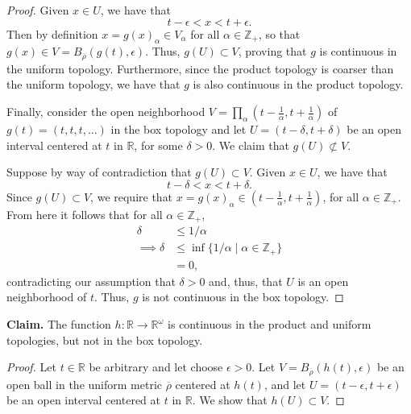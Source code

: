 \documentclass[a4paper,10pt]{article}
\newcommand{\ZZ}{\mathbb{Z}}
\newcommand{\RR}{\mathbb{R}}
\begin{document}
\begin{solution}
\begin{proof}
        Given $x \in U$, we have that
        \begin{equation*}
            t - \epsilon < x < t + \epsilon.
        \end{equation*}
        Then by definition $x = g(x)_\alpha \in V_\alpha$ for all $\alpha \in \ZZ_+$, so that $g(x) \in V = B_{\overline{\rho}}(g(t), \epsilon)$.
        Thus, $g(U) \subset V$, proving that $g$ is continuous in the uniform topology.
        Furthermore, since the product topology is coarser than the uniform topology, we have that $g$ is also continuous in the product topology.

        Finally, consider the open neighborhood $V = \prod_\alpha (t - \tfrac{1}{\alpha}, t + \tfrac{1}{\alpha})$ of $g(t) = (t, t, t, \ldots)$ in the box topology and let $U = (t - \delta, t + \delta)$ be an open interval centered at $t$ in $\RR$, for some $\delta > 0$.
        We claim that $g(U) \not\subset V$.

        Suppose by way of contradiction that $g(U) \subset V$.
        Given $x \in U$, we have that
        \begin{equation*}
            t - \delta < x < t + \delta.
        \end{equation*}
        Since $g(U) \subset V$, we require that $x = g(x)_\alpha \in (t - \tfrac{1}{\alpha}, t + \tfrac{1}{\alpha})$, for all $\alpha \in \ZZ_+$.
        From here it follows that for all $\alpha \in \ZZ_+$,
        \begin{align*}
            \delta          &\leq 1 / \alpha \\
            \implies \delta &\leq \inf\{1 / \alpha \mid \alpha \in \ZZ_+\} \\
                            &= 0,
        \end{align*}
        contradicting our assumption that $\delta > 0$ and, thus, that $U$ is an open neighborhood of $t$.
        Thus, $g$ is not continuous in the box topology.
    \end{proof}
    \bigskip

    \noindent\textbf{Claim.} The function $h: \RR \rightarrow \RR^\omega$ is continuous in the product and uniform topologies, but not in the box topology.
    \begin{proof}
        Let $t \in \RR$ be arbitrary and let choose $\epsilon > 0$.
        Let $V = B_{\overline{\rho}}(h(t), \epsilon)$ be an open ball in the uniform metric $\overline{\rho}$ centered at $h(t)$, and let $U = (t - \epsilon, t + \epsilon)$ be an open interval centered at $t$ in $\RR$.
        We show that $h(U) \subset V$.


\end{proof}
\end{solution}
\end{document}
